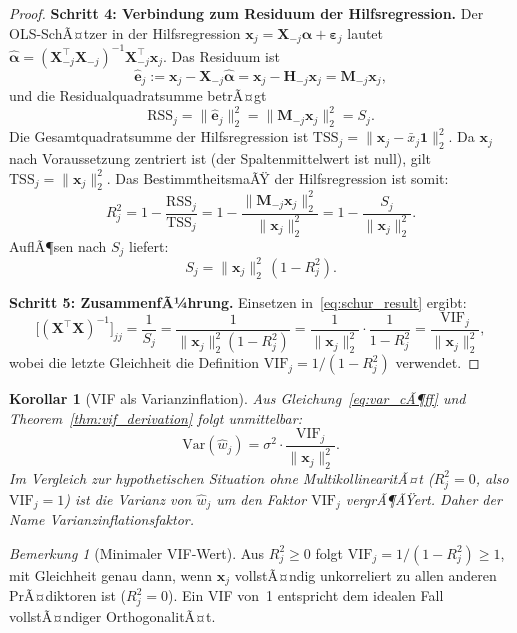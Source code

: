 ﻿\documentclass[12pt, a4paper]{article}
\newtheorem{corollary}[theorem]{Korollar}
\theoremstyle{definition}
\theoremstyle{remark}
\newtheorem{remark}[theorem]{Bemerkung}
\newcommand{\vx}{\bm{x}}
\newcommand{\vX}{\bm{X}}
\newcommand{\T}{\top}
\begin{document}
\begin{proof}
	\textbf{Schritt 4: Verbindung zum Residuum der Hilfsregression.}
	Der OLS-SchÃ¤tzer in der Hilfsregression $\vx_j = \vX_{-j}\bm{\alpha} + \bm{\varepsilon}_j$
	lautet $\hat{\bm{\alpha}} = (\vX_{-j}^\T\vX_{-j})^{-1}\vX_{-j}^\T\vx_j$. Das Residuum ist
	\[
	\hat{\bm{e}}_j := \vx_j - \vX_{-j}\hat{\bm{\alpha}}
	= \vx_j - \bm{H}_{-j}\vx_j = \bm{M}_{-j}\vx_j,
	\]
	und die Residualquadratsumme betrÃ¤gt
	\[
	\mathrm{RSS}_j = \|\hat{\bm{e}}_j\|_2^2 = \|\bm{M}_{-j}\vx_j\|_2^2 = S_j.
	\]
	Die Gesamtquadratsumme der Hilfsregression ist $\mathrm{TSS}_j = \|\vx_j - \bar{x}_j\bm{1}\|_2^2$.
	Da $\vx_j$ nach Voraussetzung zentriert ist (der Spaltenmittelwert ist null), gilt
	$\mathrm{TSS}_j = \|\vx_j\|_2^2$. Das BestimmtheitsmaÃŸ der Hilfsregression ist somit:
	\[
	R_j^2 = 1 - \frac{\mathrm{RSS}_j}{\mathrm{TSS}_j}
	= 1 - \frac{\|\bm{M}_{-j}\vx_j\|_2^2}{\|\vx_j\|_2^2}
	= 1 - \frac{S_j}{\|\vx_j\|_2^2}.
	\]
	AuflÃ¶sen nach $S_j$ liefert:
	\[
	S_j = \|\vx_j\|_2^2\,(1 - R_j^2).
	\]

	\textbf{Schritt 5: ZusammenfÃ¼hrung.}
	Einsetzen in~\eqref{eq:schur_result} ergibt:
	\[
	\bigl[(\vX^\T\vX)^{-1}\bigr]_{jj}
	= \frac{1}{S_j}
	= \frac{1}{\|\vx_j\|_2^2(1 - R_j^2)}
	= \frac{1}{\|\vx_j\|_2^2} \cdot \frac{1}{1-R_j^2}
	= \frac{\mathrm{VIF}_j}{\|\vx_j\|_2^2},
	\]
	wobei die letzte Gleichheit die Definition $\mathrm{VIF}_j = 1/(1-R_j^2)$ verwendet.
\end{proof}

\begin{corollary}[VIF als Varianzinflation]
	\label{cor:vif_inflation}
	Aus Gleichung~\eqref{eq:var_cÃ¶ff} und Theorem~\ref{thm:vif_derivation} folgt unmittelbar:
	\begin{equation}
		\mathrm{Var}(\hat{w}_j) = \sigma^2 \cdot \frac{\mathrm{VIF}_j}{\|\vx_j\|_2^2}.
		\label{eq:var_inflated}
	\end{equation}
	Im Vergleich zur hypothetischen Situation ohne MultikollinearitÃ¤t ($R_j^2 = 0$, also $\mathrm{VIF}_j = 1$)
	ist die Varianz von $\hat{w}_j$ um den Faktor $\mathrm{VIF}_j$ vergrÃ¶ÃŸert. Daher der Name
	\emph{Varianzinflationsfaktor}.
\end{corollary}

\begin{remark}[Minimaler VIF-Wert]
	Aus $R_j^2 \geq 0$ folgt $\mathrm{VIF}_j = 1/(1-R_j^2) \geq 1$, mit Gleichheit genau dann,
	wenn $\vx_j$ vollstÃ¤ndig unkorreliert zu allen anderen PrÃ¤diktoren ist ($R_j^2 = 0$).
	Ein VIF von~1 entspricht dem idealen Fall vollstÃ¤ndiger OrthogonalitÃ¤t.
\end{remark}
\end{document}
